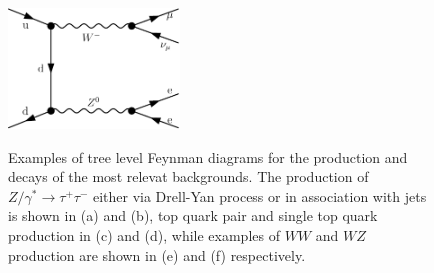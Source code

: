 \begin{figure}[tp]
\begin{center}
{            \includegraphics[height=3.2cm]{feyn_diagrams/diagrams/diboson2.pdf}
	}	
     \end{center}
    \caption{Examples of tree level Feynman diagrams for the production and decays of the most relevat backgrounds. The production of 
	 $Z/\gamma^* \rightarrow \tau^+ \tau^- $ either via Drell-Yan process or in association with jets  is shown in (a) and (b), top quark pair and
	single top quark production in (c) and (d), while examples of $WW$ and $WZ$ production are shown in (e) and (f) respectively.
	}
   \label{fig:feyndiagBack}
\end{figure}



